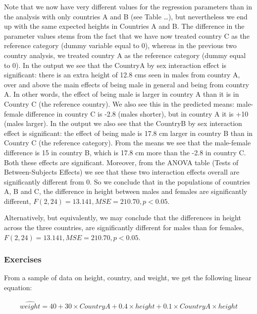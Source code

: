 Note that we now have very different values for the regression parameters than in the analysis with only countries A and B (see Table \dots), but nevertheless we end up with the same expected heights in Countries A and B. The difference in the parameter values stems from the fact that we have now treated country C as the reference category (dummy variable equal to 0), whereas in the previous two country analysis, we treated country A as the reference category (dummy equal to 0). In the output we see that the CountryA by sex interaction effect is significant: there is an extra height of 12.8 cms seen in males from country A, over and above the main effects of being male in general and being from country A. In other words, the effect of being male is larger in country A than it is in Country C (the reference country). We also see this in the predicted means: male-female difference in country C is -2.8 (males shorter), but in country A it is +10 (males larger). In the output we also see that the CountryB by sex interaction effect is significant: the effect of being male is 17.8 cm larger in country B than in Country C (the reference category). From the means we see that the male-female difference is 15 in country B, which is 17.8 cm more than the -2.8 in country C. Both these effects are significant. Moreover, from the ANOVA table (Tests of Between-Subjects Effects) we see that these two interaction effects overall are significantly different from 0. So we conclude that in the populations of countries A, B and C, the difference in height between males and females are significantly different, $F(2,24)=13.141, MSE=210.70, p < 0.05$.


Alternatively, but equivalently, we may conclude that the differences in height across the three countries, are significantly different for males than for females, $F(2,24)=13.141, MSE=210.70, p < 0.05$.\\



\subsubsection{Exercises}

From a sample of data on height, country, and weight, we get the following linear equation:


\begin{eqnarray}
\widehat{weight}= 40 + 30 \times CountryA + 0.4\times height + 0.1 \times CountryA\times height \nonumber
\end{eqnarray}

